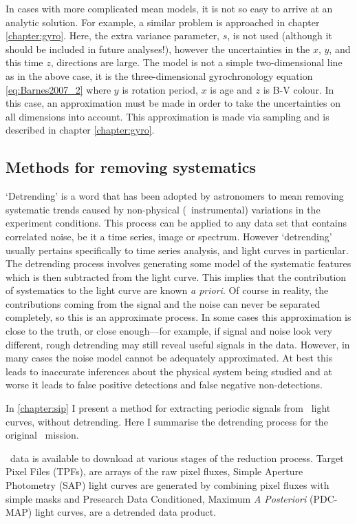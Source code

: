 In cases with more complicated mean models, it is not so easy to arrive at an
analytic solution.
For example, a similar problem is approached in chapter \ref{chapter:gyro}.
Here, the extra variance parameter, $s$, is not used (although it should be
included in future analyses!), however the uncertainties in the $x$, $y$, and
this time $z$, directions are large.
The model is not a simple two-dimensional line as in the above case, it is the
three-dimensional gyrochronology equation \ref{eq:Barnes2007_2} where $y$ is
rotation period, $x$ is age and $z$ is B-V colour.
In this case, an approximation must be made in order to take the uncertainties
on all dimensions into account.
This approximation is made via sampling and is described in chapter
\ref{chapter:gyro}.

\subsection{Methods for removing systematics}
\label{sec:detrending}

`Detrending' is a word that has been adopted by astronomers to mean removing
systematic trends caused by non-physical (\ie\ instrumental) variations in the
experiment conditions.
This process can be applied to any data set that contains correlated noise, be
it a time series, image or spectrum.
However `detrending' usually pertains specifically to time series analysis,
and light curves in particular.
The detrending process involves generating some model of the systematic
features which is then subtracted from the light curve.
This implies that the contribution of systematics to the light curve are known
{\it a priori}.
Of course in reality, the contributions coming from the signal and the noise
can never be separated completely, so this is an approximate process.
In some cases this approximation is close to the truth, or close enough---for
example, if signal and noise look very different, rough detrending may still
reveal useful signals in the data.
However, in many cases the noise model cannot be adequately approximated.
At best this leads to inaccurate inferences about the physical system being
studied and at worse it leads to false positive detections and false negative
non-detections.

In \textsection \ref{chapter:sip} I present a method for extracting periodic
signals from \ktwo\ light curves, without detrending.
Here I summarise the detrending process for the original \kepler\ mission.

\kepler\ data is available to download at various stages of the reduction
process.
Target Pixel Files (TPFs), are arrays of the raw pixel fluxes, Simple Aperture
Photometry (SAP) light curves are generated by combining pixel fluxes with
simple masks and Presearch Data Conditioned, Maximum {\it A Posteriori}
(PDC-MAP) light curves, are a detrended data product.


